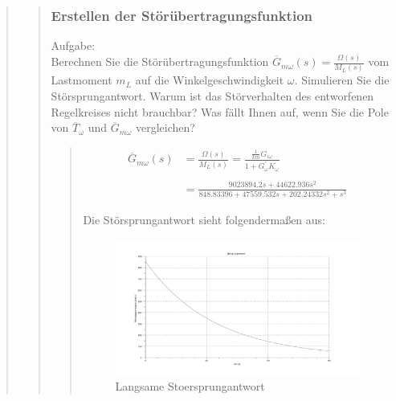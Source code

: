 \begin{quote}
\begin{quote}
        \subsubsection{Erstellen der Störübertragungsfunktion}
        \label{2e}
        Aufgabe:\\
        Berechnen Sie die Störübertragungsfunktion $\overline{G}_{m\omega} (s) = \frac{\Omega(s)}{M_L (s)}$ vom
        Lastmoment $m_L$ auf die Winkelgeschwindigkeit $\omega$. Simulieren Sie die Störsprungantwort. Warum ist das
        Störverhalten des entworfenen Regelkreises nicht brauchbar? Was fällt Ihnen auf, wenn Sie die Pole von
        $\overline{T}_\omega$ und $\overline{G}_{m\omega}$ vergleichen?
		\begin{quote}
			\begin{equation*}
            	\begin{split}
            		\overline{G}_{m\omega} (s) &= \frac{\Omega(s)}{M_L (s)} = \frac{\frac{1}{km}G_{i\omega}}{1+ G_\omega^{'}
            		K_\omega}\\ \\
            		&= \frac{9023894.2s + 44622.936s^2}{848.83396 + 47559.532s + 202.24332s^2 + s^3}
            	\end{split}
            \end{equation*}
            
            Die Störsprungantwort sieht folgendermaßen aus:
            \begin{figure}[H]
                \centering
                    \includegraphics[scale=0.5, trim = 0cm 0cm 0cm 0cm, clip]{./Bilder/Stoersprungantwortlangsam}
                        \caption{Langsame Stoersprungantwort}
                        \label{fig:filename}
            \end{figure}
    

\end{quote}
\end{quote}
\end{quote}
